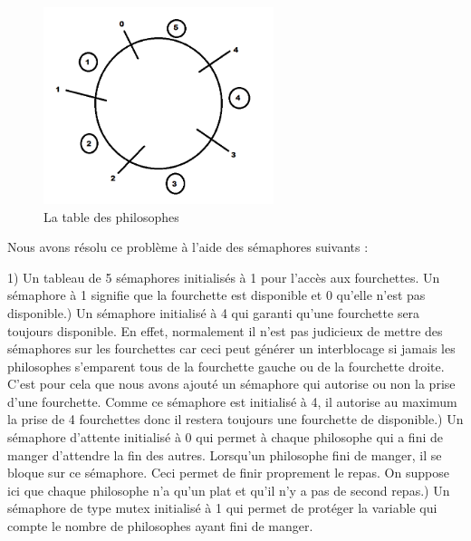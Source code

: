 \documentclass[a4paper,12pt]{report}
\begin{document}
\begin{figure}[h]
	\centering
		\includegraphics[width=0.6\textwidth]{screens/philo_table.png}
		\caption{La table des philosophes}
\end{figure}

\newpage

Nous avons résolu ce problème à l'aide des sémaphores suivants :\newline

1) Un tableau de 5 sémaphores initialisés à 1 pour l'accès aux fourchettes. Un sémaphore à 1 signifie que la fourchette est disponible et 0 qu'elle n'est pas disponible.) Un sémaphore initialisé à 4 qui garanti qu'une fourchette sera toujours disponible. En effet, normalement il n'est pas judicieux de mettre des sémaphores sur les fourchettes car ceci peut générer un interblocage si jamais les philosophes s'emparent tous de la fourchette gauche ou de la fourchette droite. C'est pour cela que nous avons ajouté un sémaphore qui autorise ou non la prise d'une fourchette. Comme ce sémaphore est initialisé à 4, il autorise au maximum la prise de 4 fourchettes donc il restera toujours une fourchette de disponible.) Un sémaphore d'attente initialisé à 0 qui permet à chaque philosophe qui a fini de manger d'attendre la fin des autres. Lorsqu'un philosophe fini de manger, il se bloque sur ce sémaphore. Ceci permet de finir proprement le repas. On suppose ici que chaque philosophe n'a qu'un plat et qu'il n'y a pas de second repas.) Un sémaphore de type mutex initialisé à 1 qui permet de protéger la variable qui compte le nombre de philosophes ayant fini de manger.\newline
\end{document}

